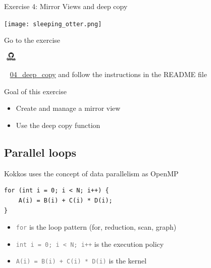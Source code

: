 \documentclass[aspectratio=169]{beamer}
\newcommand{\githublink}[2][2em]{%
    \hspace{-0.25em}%
    \parbox[c][#1][c]{#1}{%
        \includegraphics[width=#1]{GitHub-logo.png}%
    }%
    \hspace{-0.25em}%
    ~%
    #2%
}
\begin{document}

\begin{frame}{Exercise 4: Mirror Views and deep copy}
    \begin{center}
        \texttt{[image: sleeping\_otter.png]}
    \end{center}

    Go to the exercise \githublink{\href{https://github.com/CExA-project/cexa-kokkos-tutorials/tree/main/exercises/04_deep_copy}{04\_deep\_copy}} and follow the instructions in the README file

    \begin{block}{Goal of this exercise}
        \begin{itemize}
            \item Create and manage a mirror view
            \item Use the deep copy function
        \end{itemize}
    \end{block}
\end{frame}


\subsection{Parallel loops}


\begin{frame}[fragile]{Kokkos uses the concept of data parallelism as OpenMP}
    \begin{verbatim}
for (int i = 0; i < N; i++) {
    A(i) = B(i) + C(i) * D(i);
}
    \end{verbatim}
    \begin{itemize}
        \item \textcolor{gray}{\texttt{for}} is the loop pattern (for, reduction, scan, graph)
        \item \textcolor{gray}{\texttt{int i = 0; i < N; i++}} is the execution policy
        \item \textcolor{gray}{\texttt{A(i) = B(i) + C(i) * D(i)}} is the kernel
    \end{itemize}
\end{frame}

\end{document}
